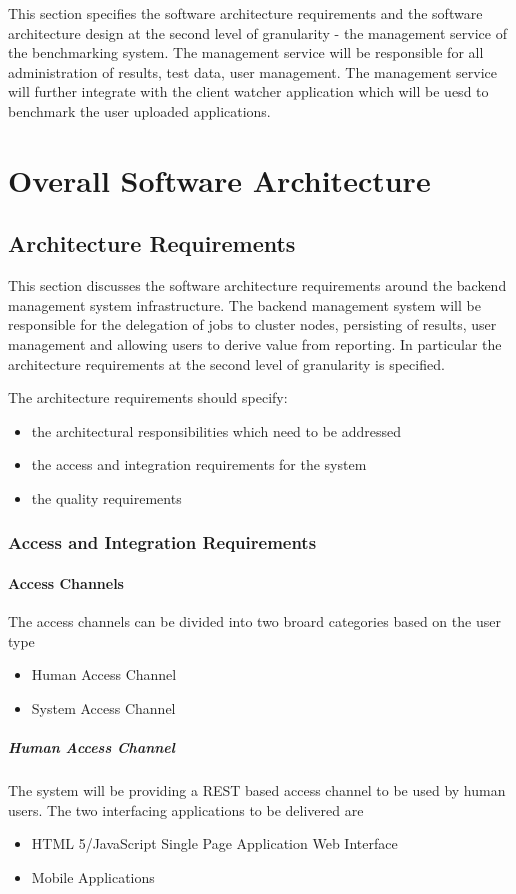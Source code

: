 This section specifies the software architecture requirements and the software
architecture design at the second level of granularity - the management service
of the benchmarking system. The management service will be responsible for all
administration of results, test data, user management. The management service
will further integrate with the client watcher application which will be uesd to
benchmark the user uploaded applications.

\section{Overall Software Architecture}
\subsection{Architecture Requirements}
This section discusses the software architecture requirements around the
backend management system infrastructure. The backend management system will be
responsible for the delegation of jobs to cluster nodes, persisting of results,
user management and allowing users to derive value from reporting. In particular
the architecture requirements at the second level of granularity is specified.

The architecture requirements should specify:
\begin{itemize}
	\item the architectural responsibilities which need to be addressed
	\item the access and integration requirements for the system
	\item the quality requirements
\end{itemize}


\subsubsection{Access and Integration Requirements}
\paragraph{Access Channels}
The access channels can be divided into two broard categories based on the user type
\begin{itemize}
	\item Human Access Channel
	\item System Access Channel
\end{itemize}

\subparagraph{Human Access Channel}
The system will be providing a REST based access channel to be used by human
users. The two interfacing applications to be delivered are
\begin{itemize}
	\item HTML 5/JavaScript Single Page Application Web Interface
	\item Mobile Applications
\end{itemize}

